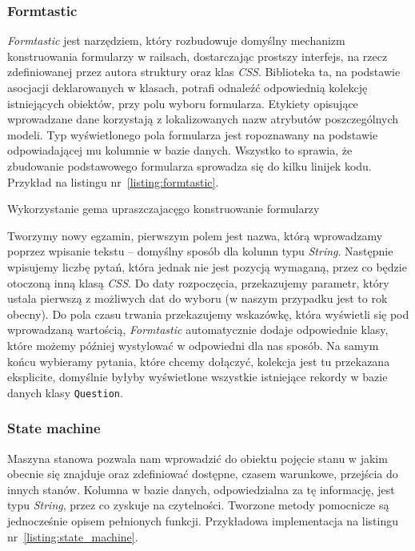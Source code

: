 \documentclass[a4paper,12pt]{article}
\begin{document}
\subsubsection{Formtastic}
\emph{Formtastic} jest narzędziem, który rozbudowuje domyślny mechanizm konstruowania
formularzy w railsach, dostarczając prostszy interfejs, na rzecz zdefiniowanej przez
autora struktury oraz klas \emph{CSS}. Biblioteka ta, na podstawie asocjacji deklarowanych
w klasach, potrafi odnaleźć odpowiednią kolekcję istniejących obiektów, przy polu wyboru
formularza. Etykiety opisujące wprowadzane dane korzystają z lokalizowanych nazw atrybutów
poszczególnych modeli. Typ wyświetlonego pola formularza jest ropoznawany na podstawie
odpowiadającej mu kolumnie w bazie danych. Wszystko to sprawia, że zbudowanie podstawowego
formularza sprowadza się do kilku linijek kodu. Przykład na listingu
nr~\ref{listing:formtastic}.

\begin{listing}
  
  \caption{Wykorzystanie gema upraszczajacęgo konstruowanie formularzy}
  \label{listing:formtastic}
\end{listing}


Tworzymy nowy egzamin, pierwszym polem jest nazwa, którą wprowadzamy poprzez wpisanie
tekstu -- domyślny sposób dla kolumn typu \emph{String}. Następnie wpisujemy liczbę pytań,
która jednak nie jest pozycją wymaganą, przez co będzie otoczoną inną klasą \emph{CSS}.
Do daty rozpoczęcia, przekazujemy parametr, który ustala pierwszą z możliwych dat do
wyboru (w naszym przypadku jest to rok obecny). Do pola czasu trwania przekazujemy
wskazówkę, która wyświetli się pod wprowadzaną wartością, \emph{Formtastic} automatycznie
dodaje odpowiednie klasy, które możemy później wystylować w odpowiedni dla nas sposób. Na
samym końcu wybieramy pytania, które chcemy dołączyć, kolekcja jest tu przekazana
eksplicite, domyślnie byłyby wyświetlone wszystkie istniejące rekordy w bazie danych klasy
\texttt{Question}.

\subsubsection{State machine}\label{sec:state_machine}
Maszyna stanowa pozwala nam wprowadzić do obiektu pojęcie stanu w jakim obecnie się
znajduje oraz zdefiniować dostępne, czasem warunkowe, przejścia do innych stanów. Kolumna
w bazie danych, odpowiedzialna za tę informację, jest typu \emph{String}, przez co
zyskuje na czytelności. Tworzone metody pomocnicze są jednocześnie opisem pełnionych
funkcji. Przykładowa implementacja na listingu nr~\ref{listing:state_machine}.
\end{document}
